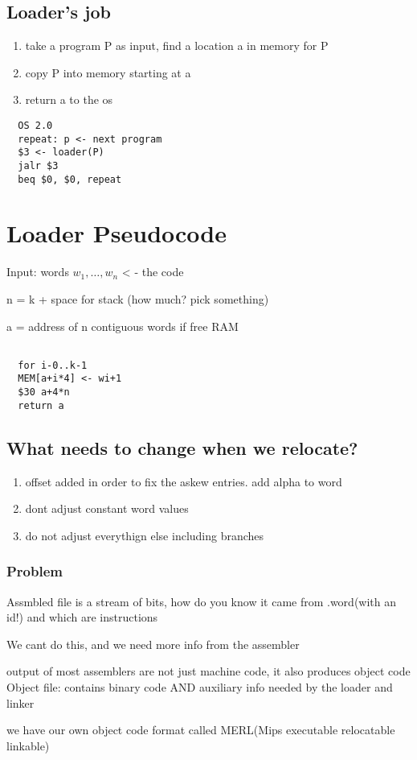 \documentclass[11pt]{amsart}
\begin{document}
\subsection{Loader's job}
\begin{enumerate}
  \item take a program P as input, find a location a in memory for P
  \item copy P into memory starting at a
  \item return a to the os
\end{enumerate}
\begin{verbatim}
  OS 2.0
  repeat: p <- next program
  $3 <- loader(P)
  jalr $3
  beq $0, $0, repeat
\end{verbatim}
\section{Loader Pseudocode}
\par Input: words $w_1 , \dots, w_n$ < - the code
\par n = k + space for stack (how much? pick something)
\par a = address of n contiguous words if free RAM
\begin{verbatim}

  for i-0..k-1
  MEM[a+i*4] <- wi+1
  $30 a+4*n
  return a

\end{verbatim}
\subsection{What needs to change when we relocate?}
\begin{enumerate}
  \item offset added in order to  fix the askew entries. add alpha to word
  \item dont adjust constant word values
  \item do not adjust everythign else including branches
\end{enumerate}
\subsubsection{Problem}
\par Assmbled file is a stream of bits, how do you know it came from .word(with
an id!) and which are instructions
\par We cant do this, and we need more info from the assembler
\par output of most assemblers are not just machine code, it also produces
object code
Object file: contains binary code AND auxiliary info needed by the loader and
linker
\par we have our own object code format called MERL(Mips executable relocatable
linkable)
\end{document}
